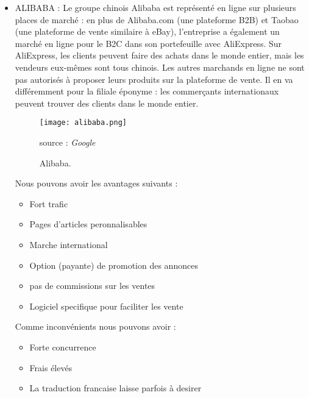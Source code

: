 \begin{itemize}[label=\textbullet, font=\LARGE \color{blue}]
	\item ALIBABA : Le groupe chinois Alibaba est représenté en ligne sur plusieurs places de marché : en plus de Alibaba.com (une plateforme B2B) et Taobao (une plateforme de vente similaire à eBay), l'entreprise a également un marché en ligne pour le B2C dans son portefeuille avec AliExpress. Sur AliExpress, les clients peuvent faire des achats dans le monde entier, mais les vendeurs eux-mêmes sont tous chinois. Les autres marchands en ligne ne sont pas autorisés à proposer leurs produits sur la plateforme de vente. Il en va différemment pour la filiale éponyme : les commerçants internationaux peuvent trouver des clients dans le monde entier.
		\begin{figure}[H]
			\centering
			\texttt{[image: alibaba.png]}
			\caption{Alibaba.}{ \begin{center} source : \textit{Google} \end{center}}
			\label{fig:alibaba}
		\end{figure}
		Nous pouvons avoir les avantages suivants :
	\begin{itemize}[label=\textbullet, font=\LARGE \color{black}] 
		\item Fort trafic
		\item Pages d'articles peronnalisables	
		\item Marche international
		\item Option (payante) de promotion des annonces
		\item pas de commissions sur les ventes
		\item Logiciel specifique pour faciliter les vente
	\end{itemize}
	Comme inconvénients nous pouvons avoir  :
	\begin{itemize}[label=\textbullet, font=\LARGE \color{black}] 
		\item Forte concurrence
		\item Frais élevés 	
		\item La traduction francaise laisse parfois à desirer
	\end{itemize}
	

\end{itemize}
